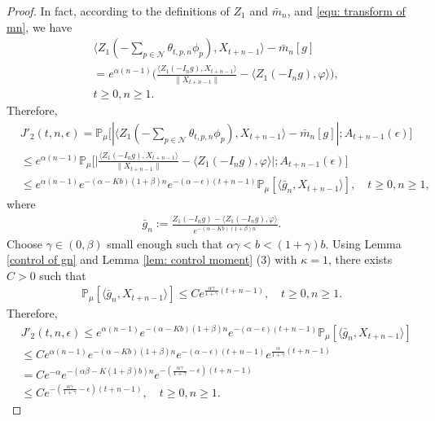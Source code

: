 \documentclass[12pt,a4paper]{amsart}
\theoremstyle{plain}
\theoremstyle{definition}
\numberwithin{equation}{section}
\begin{document}
\begin{proof}
In fact, according to the definitions of $Z_1$ and $\bar{m}_n$, and \eqref{equ: transform of mn}, we have
\begin{align}
    &\langle Z_1(-\sum_{p\in \mathcal{N}}\theta_{t,p,n}\phi_p), X_{t+n-1}\rangle-\bar{m}_n[g]\\
    &=e^{\alpha(n-1)}\Big(\frac{\langle Z_1(-I_ng),X_{t+n-1}\rangle}{\|X_{t+n-1}\|}-\langle Z_1(-I_ng),\varphi\rangle\Big),\\
    & t\geq 0, n\geq1.
\end{align}
Therefore,
\begin{align}
    &J'_2(t,n,\epsilon)
	= \mathbb{P}_{\mu}\big[|\langle Z_1(-\sum_{p\in\mathcal{N}}\theta_{t,p,n}\phi_p),X_{t+n-1}\rangle-\bar{m}_n[g]|; A_{t+n-1}(\epsilon)\big]\\
	&\leq e^{\alpha(n-1)}\mathbb{P}_{\mu}\Big[\big|\frac{\langle Z_1(-I_ng),X_{t+n-1}\rangle}{\|X_{t+n-1}\|}-\langle Z_1(-I_ng),\varphi\rangle\big|;A_{t+n-1}(\epsilon)\Big]\\
	&\leq e^{\alpha(n-1)}e^{-(\alpha-Kb)(1+\beta)n}e^{-(\alpha-\epsilon)(t+n-1)}\mathbb{P}_{\mu}
[\langle \bar {g}_n, X_{t+n-1}\rangle],
	\quad t\geq 0, n\geq 1,
\end{align}
where
\begin{align}
    \bar{g}_n:=\frac{Z_1(-I_ng)-\langle Z_1(-I_ng),\varphi\rangle}{e^{-(\alpha-Kb)(1+\beta)n}}.
\end{align}
 Choose $\gamma\in(0,\beta)$ small enough such that $\alpha \gamma < b < (1+\gamma)b$.
Using Lemma \ref{control of gn} and Lemma \ref{lem: control moment} (3) with $\kappa=1$,
 there exists $C>0$ such that
\begin{align}
    \mathbb{P}_{\mu}[\langle \bar{g}_n, X_{t+n-1}\rangle]\leq Ce^{\frac{\alpha \gamma}{1+\gamma}(t+n-1)},\quad t\geq0, n\geq 1.
\end{align}
Therefore,
\begin{align}
    &J'_2(t,n,\epsilon)\leq e^{\alpha(n-1)}e^{-(\alpha-Kb)(1+\beta)n}e^{-(\alpha-\epsilon)(t+n-1)}\mathbb{P}_{\mu}[\langle \bar{g}_n, X_{t+n-1}\rangle]\\
    &\leq C e^{\alpha(n-1)}e^{-(\alpha-Kb)(1+\beta)n}e^{-(\alpha-\epsilon)(t+n-1)}e^{\frac{\alpha }{1+\gamma}(t+n-1)}\\
    &=Ce^{-\alpha}e^{-(\alpha\beta-K(1+\beta)b)n}e^{-(\frac{\alpha\gamma}{1+\gamma}-\epsilon)(t+n-1)}\\&\leq Ce^{-(\frac{\alpha\gamma}{1+\gamma}-\epsilon)(t+n-1)},\quad t\geq 0,n\geq 1.

\end{align}
\end{proof}
\end{document}
